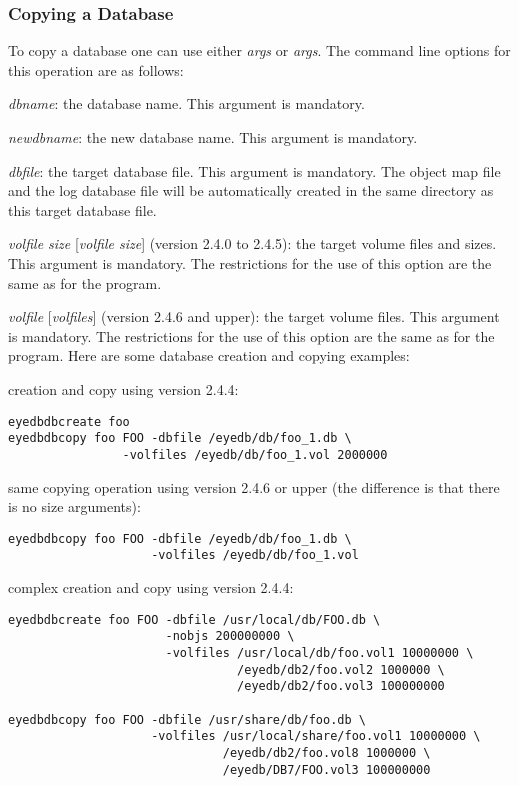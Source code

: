 \subsubsection{Copying a Database}
To copy a database one can use either  \emph{args}
or  \emph{args}.
The command line options for this operation are as follows:
\bi
\item \emph{dbname}: the database name. This argument is mandatory.
\item \emph{newdbname}: the new database name. This argument is mandatory.
\item {} \emph{dbfile}:
the target database file. This argument is mandatory.
The object map file
and the log database file will be automatically created in the
same directory as this target database file.
\item {} \emph{volfile size} [\emph{volfile size}] (version
2.4.0 to 2.4.5):
the target volume files and sizes. This argument is mandatory.
The restrictions for the use of this option are the same as for
the  program.
\item {} \emph{volfile} [\emph{volfiles}] (version
2.4.6 and upper):
the target volume files. This argument is mandatory.
The restrictions for the use of this option are the same as for
the  program.
\ei
Here are some database creation and copying examples:
\bi
\item creation and copy using version 2.4.4:
\verbsize
\begin{verbatim}
eyedbdbcreate foo
eyedbdbcopy foo FOO -dbfile /eyedb/db/foo_1.db \
                -volfiles /eyedb/db/foo_1.vol 2000000
\end{verbatim}
\normalsize
\item same copying operation using version 2.4.6 or upper (the difference is that there is no
size arguments):
\verbsize
\begin{verbatim}
eyedbdbcopy foo FOO -dbfile /eyedb/db/foo_1.db \
                    -volfiles /eyedb/db/foo_1.vol
\end{verbatim}
\normalsize
\item complex creation and copy using version 2.4.4:
\verbsize
\begin{verbatim}
eyedbdbcreate foo FOO -dbfile /usr/local/db/FOO.db \
                      -nobjs 200000000 \
                      -volfiles /usr/local/db/foo.vol1 10000000 \
                                /eyedb/db2/foo.vol2 1000000 \
                                /eyedb/db2/foo.vol3 100000000

eyedbdbcopy foo FOO -dbfile /usr/share/db/foo.db \
                    -volfiles /usr/local/share/foo.vol1 10000000 \
                              /eyedb/db2/foo.vol8 1000000 \
                              /eyedb/DB7/FOO.vol3 100000000
\end{verbatim}
